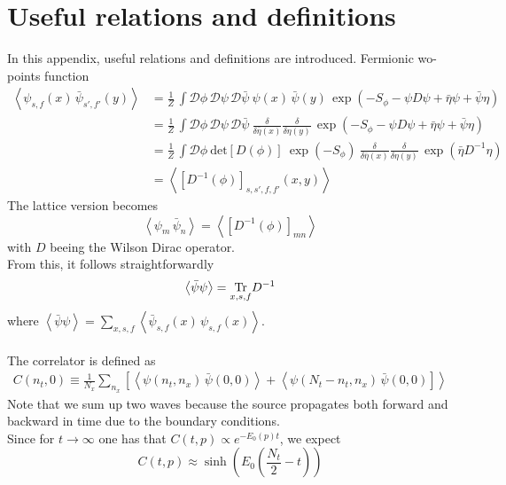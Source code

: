 
\chapter{Useful relations and definitions} %
\label{chap:AppendixA} %
In this appendix, useful relations and definitions are introduced.
Fermionic wo-points function
\begin{equation} 
\begin{aligned}
    \left\langle \psi_{s,f}(x) \, \bar\psi_{s',f'}(y) \right\rangle 
    &= \frac{1}{Z} \, \int \mathcal{D}\phi \, \mathcal{D}\psi \, \mathcal{D}\bar\psi \ \psi(x) \, \bar\psi(y) \, \exp \left( - S_\phi - \psi D \psi + \bar\eta \psi + \bar \psi \eta \right) \\
    &= \frac{1}{Z} \, \int \mathcal{D}\phi \, \mathcal{D}\psi \, \mathcal{D}\bar\psi \ \frac{\delta}{\delta \bar \eta(x)} \frac{\delta}{\delta \eta(y)} \, \exp \left( - S_\phi - \psi D \psi + \bar\eta \psi + \bar \psi \eta \right) \\
    &= \frac{1}{Z} \, \int \mathcal{D}\phi \ \text{det}\left[D(\phi)\right] \ \exp \left( - S_\phi \right) \ \frac{\delta}{\delta \bar \eta(x)} \frac{\delta}{\delta \eta(y)} \, \exp\left( \bar\eta D^{-1} \eta \right) \\
    &= \left\langle \left[D^{-1}(\phi)\right]_{s,s',f,f'}(x,y)\right\rangle
\end{aligned}
\label{eq:D_inv_condensate}
\end{equation}
The lattice version becomes
\begin{equation*}
     \left\langle \psi_m \, \bar\psi_n \right\rangle =     \left\langle \left[D^{-1}(\phi)\right]_{mn}\right\rangle
\end{equation*}
with $D$ beeing the Wilson Dirac operator. \\
From this, it follows straightforwardly
\begin{equation*}
    \left\langle  \bar\psi \psi \right\rangle = \underset{x,s,f}{\operatorname{\text{Tr}}} D^{-1}
\end{equation*}
where $\left\langle  \bar\psi \psi \right\rangle = \underset{x,s,f}\sum  \left\langle \bar\psi_{s,f}(x) \, \psi_{s,f}(x) \right\rangle$. \\~\\
The correlator is defined as
\begin{align*}
    C(n_t,0) \equiv \frac{1}{N_x} \sum_{n_x} \left[\left\langle \psi(n_t, n_x) \, \bar\psi(0,0)\right\rangle + \left\langle \psi(N_t-n_t, n_x) \, \bar\psi(0,0) \right] \right\rangle
\end{align*}
Note that we sum up two waves because the source propagates both forward and backward in time due to the boundary conditions. \\
Since for $t \to \infty$ one has that $C(t,p) \propto e^{-E_0(p) t}$, we expect 
\begin{equation*}
    C(t,p) \approx \sinh \left(E_0 \left(\frac{N_t}{2} - t\right)\right)
\end{equation*}


